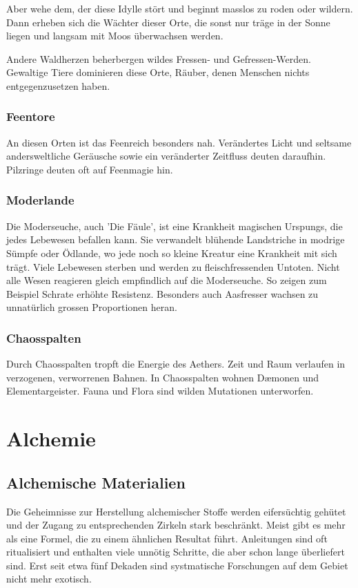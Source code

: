 \documentclass[10pt,twoside,twocolumn,openany]{book}
\begin{document}
Aber wehe dem, der diese Idylle stört und beginnt masslos zu roden oder wildern. Dann erheben sich die Wächter dieser Orte, die sonst nur träge in der Sonne liegen und langsam mit Moos überwachsen werden.

Andere Waldherzen beherbergen wildes Fressen- und Gefressen-Werden. Gewaltige Tiere dominieren diese Orte, Räuber, denen Menschen nichts entgegenzusetzen haben.


\subsubsection{Feentore}
An diesen Orten ist das Feenreich besonders nah. Verändertes Licht und seltsame andersweltliche Geräusche sowie ein veränderter Zeitfluss deuten daraufhin. Pilzringe deuten oft auf Feenmagie hin.


\subsubsection{Moderlande}
Die Moderseuche, auch 'Die Fäule', ist eine Krankheit magischen Urspungs, die jedes Lebewesen befallen kann. Sie verwandelt blühende Landstriche in modrige Sümpfe oder Ödlande, wo jede noch so kleine Kreatur eine Krankheit mit sich trägt. Viele Lebewesen sterben und werden zu fleischfressenden Untoten.
Nicht alle Wesen reagieren gleich empfindlich auf die Moderseuche. So zeigen zum Beispiel Schrate erhöhte Resistenz. Besonders auch Aasfresser wachsen zu unnatürlich grossen Proportionen heran.


\subsubsection{Chaosspalten}
Durch Chaosspalten tropft die Energie des Aethers. Zeit und Raum verlaufen in verzogenen, verworrenen Bahnen. In Chaosspalten wohnen D\ae monen und Elementargeister. Fauna und Flora sind wilden Mutationen unterworfen.



\section{Alchemie}
\subsection*{Alchemische Materialien}
Die Geheimnisse zur Herstellung alchemischer Stoffe werden eifersüchtig gehütet und der Zugang zu entsprechenden Zirkeln stark beschränkt. Meist gibt es mehr als eine Formel, die zu einem ähnlichen Resultat führt. Anleitungen sind oft ritualisiert und enthalten viele unnötig Schritte, die aber schon lange überliefert sind. Erst seit etwa fünf Dekaden sind systmatische Forschungen auf dem Gebiet nicht mehr exotisch.
\end{document}
